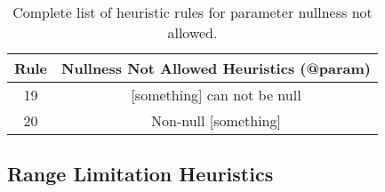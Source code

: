 \begin{table}[]
	\begin{tabular}{|c|c|}
		\hline
		\textbf{Rule} & \textbf{Nullness Not Allowed Heuristics (@param)} \\ \hline
		19 & [something] can not be null \\ \hline
		20 & Non-null [something] \\ \hline
	\end{tabular}
	\caption{Complete list of heuristic rules for parameter nullness not allowed.}
	\label{tab:complete-not-null-heuristic-param}
\end{table}

\subsection{Range Limitation Heuristics}
\label{app:range-limit}
